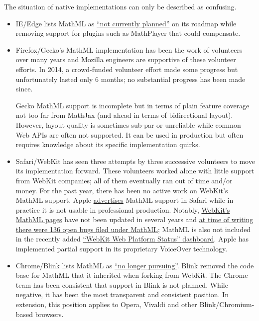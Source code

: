 \documentclass[]{amsart}
\begin{document}
The situation of native implementations can only be described as
confusing.

\begin{itemize}
\item
  IE/Edge lists MathML as
  \href{http://dev.modern.ie/platform/status/?filter=f3f0000bf\&search=math}{``not
  currently planned''} on its roadmap while removing support for plugins
  such as MathPlayer that could compensate.
\item
  Firefox/Gecko's MathML implementation has been the work of volunteers
  over many years and Mozilla engineers are supportive of these
  volunteer efforts. In 2014, a crowd-funded volunteer effort made some
  progress but unfortunately lasted only 6 months; no substantial
  progress has been made since.

Gecko MathML support is incomplete but in terms of plain feature
coverage not too far from MathJax (and ahead in terms of bidirectional
layout). However, layout quality is sometimes sub-par or unreliable
while common Web APIs are often not supported. It can be used in
production but often requires knowledge about its specific
implementation quirks.

\item
  Safari/WebKit has seen three attempts by three successive volunteers
  to move its implementation forward. These volunteers worked alone with
  little support from WebKit companies; all of them eventually ran out
  of time and/or money. For the past year, there has been no active work
  on WebKit's MathML support. Apple
  \href{https://developer.apple.com/safari/features/}{advertises} MathML
  support in Safari while in practice it is not usable in professional
  production. Notably,
  \href{https://trac.webkit.org/wiki/MathML}{WebKit's MathML pages} have
  not been updated in several years and
  \href{https://bugs.webkit.org/buglist.cgi?bug_status=UNCONFIRMED\&bug_status=NEW\&bug_status=ASSIGNED\&bug_status=REOPENED\&field0-0-0=product\&field0-0-1=component\&field0-0-2=alias\&field0-0-3=short_desc\&field0-0-4=status_whiteboard\&field0-0-5=content\&query_format=advanced\&type0-0-0=substring\&type0-0-1=substring\&type0-0-2=substring\&type0-0-3=substring\&type0-0-4=substring\&type0-0-5=matches\&value0-0-0=mathml\&value0-0-1=mathml\&value0-0-2=mathml\&value0-0-3=mathml\&value0-0-4=mathml\&value0-0-5=\%22mathml\%22\&order=changeddate\%20DESC\%2Cbug_status\%2Cpriority\%2Cassigned_to\%2Cbug_id\&query_based_on=}{at
  time of writing there were 136 open bugs filed under MathML}; MathML
  is also not included in the recently added
  \href{https://www.webkit.org/status.html}{``WebKit Web Platform
  Status'' dashboard}. Apple has implemented partial support in its
  proprietary VoiceOver technology.
\item
  Chrome/Blink lists MathML as
  \href{https://www.chromestatus.com/features/5240822173794304}{``no
  longer pursuing''}. Blink removed the code base for MathML that it
  inherited when forking from WebKit. The Chrome team has been
  consistent that support in Blink is not planned. While negative, it
  has been the most transparent and consistent position. In extension,
  this position applies to Opera, Vivaldi and other Blink/Chromium-based
  browsers.
\end{itemize}
\end{document}
